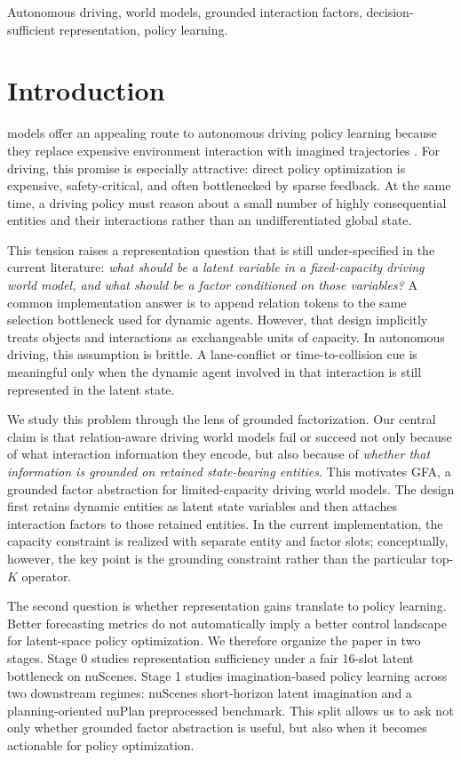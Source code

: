 \documentclass[journal]{IEEEtran}
\newcommand{\method}{\textsc{GFA}}
\begin{document}
\begin{IEEEkeywords}
Autonomous driving, world models, grounded interaction factors, decision-sufficient representation, policy learning.
\end{IEEEkeywords}

\section{Introduction}
 models offer an appealing route to autonomous driving policy learning because they replace expensive environment interaction with imagined trajectories \cite{ha2018worldmodels,hafner2023dreamerv3}. For driving, this promise is especially attractive: direct policy optimization is expensive, safety-critical, and often bottlenecked by sparse feedback. At the same time, a driving policy must reason about a small number of highly consequential entities and their interactions rather than an undifferentiated global state.

This tension raises a representation question that is still under-specified in the current literature: \emph{what should be a latent variable in a fixed-capacity driving world model, and what should be a factor conditioned on those variables?} A common implementation answer is to append relation tokens to the same selection bottleneck used for dynamic agents. However, that design implicitly treats objects and interactions as exchangeable units of capacity. In autonomous driving, this assumption is brittle. A lane-conflict or time-to-collision cue is meaningful only when the dynamic agent involved in that interaction is still represented in the latent state.

We study this problem through the lens of grounded factorization. Our central claim is that relation-aware driving world models fail or succeed not only because of what interaction information they encode, but also because of \emph{whether that information is grounded on retained state-bearing entities}. This motivates \method, a grounded factor abstraction for limited-capacity driving world models. The design first retains dynamic entities as latent state variables and then attaches interaction factors to those retained entities. In the current implementation, the capacity constraint is realized with separate entity and factor slots; conceptually, however, the key point is the grounding constraint rather than the particular top-$K$ operator.

The second question is whether representation gains translate to policy learning. Better forecasting metrics do not automatically imply a better control landscape for latent-space policy optimization. We therefore organize the paper in two stages. Stage 0 studies representation sufficiency under a fair 16-slot latent bottleneck on nuScenes. Stage 1 studies imagination-based policy learning across two downstream regimes: nuScenes short-horizon latent imagination and a planning-oriented nuPlan preprocessed benchmark. This split allows us to ask not only whether grounded factor abstraction is useful, but also when it becomes actionable for policy optimization.
\end{document}

